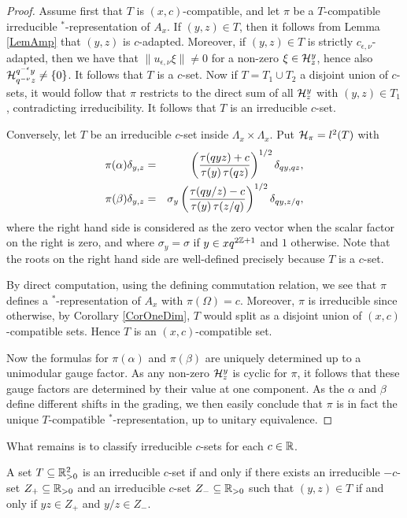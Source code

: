 \begin{proof} Assume first that $T$ is $(x,c)$-compatible, and let $\pi$ be a $T$-compatible irreducible $^*$-representation of $A_x$. If $(y,z)\in T$, then it follows from Lemma \ref{LemAmp} that $(y,z)$ is $c$-adapted. Moreover, if $(y,z)\in T$ is strictly $c_{\epsilon,\nu}$-adapted, then we have that $\|u_{\epsilon,\nu}\xi\|\neq 0$ for a non-zero $\xi\in \mathcal{H}^y_z$, hence also $\mathcal{H}^{q^{-\epsilon}y}_{q^{-\nu}z}\neq \{0\}$. It follows that $T$ is a $c$-set. Now if $T=T_1\cup T_2$ a disjoint union of $c$-sets, it would follow that $\pi$ restricts to the direct sum of all $\mathcal{H}^y_z$ with $(y,z)\in T_1$, contradicting irreducibility. It follows that $T$ is an irreducible $c$-set.

Conversely, let $T$ be an irreducible $c$-set inside $\Lambda_x\times \Lambda_x$. Put $\mathcal{H}_{\pi} = l^2(T)$ with \begin{eqnarray*} \pi(\alpha)  \delta_{y,z} &=&  \left(\frac{\operatorname{\tau}(qyz)+c}{\operatorname{\tau}(y)\operatorname{\tau}(qz)}\right)^{1/2}\delta_{qy,qz},\\ \pi(\beta) \delta_{y,z} &=& \sigma_y\left(\frac{\operatorname{\tau}(qy/z)-c}{\operatorname{\tau}(y)\operatorname{\tau}(z/q)}\right)^{1/2} \delta_{qy,z/q},\end{eqnarray*} where the right hand side is considered as the zero vector when the scalar factor on the right is zero, and where $\sigma_y = \sigma$ if $y\in xq^{2\mathbb{Z}+1}$ and $1$ otherwise. Note that the roots on the right hand side are well-defined precisely because $T$ is a $c$-set. 

By direct computation, using the defining commutation relation, we see that $\pi$ defines a $^*$-representation of $A_x$ with $\pi(\Omega) =c$. Moreover, $\pi$ is irreducible since otherwise, by Corollary \ref{CorOneDim}, $T$ would split as a disjoint union of $(x,c)$-compatible sets. Hence $T$ is an $(x,c)$-compatible set.

Now the formulas for $\pi(\alpha)$ and $\pi(\beta)$ are uniquely determined up to a unimodular gauge factor. As any non-zero $\mathcal{H}^{y}_z$ is cyclic for $\pi$, it follows that these gauge factors are determined by their value at one component. As the $\alpha$ and $\beta$ define different shifts in the grading, we then easily conclude that $\pi$ is in fact the unique $T$-compatible $^*$-representation, up to unitary equivalence.
\end{proof}

What remains is to classify irreducible $c$-sets for each $c\in \mathbb{R}$. 

\begin{Lem}\label{LemClass2D} A set $T\subseteq \mathbb{R}_{>0}^2$ is an irreducible $c$-set if and only if there exists an irreducible $-c$-set $Z_+\subseteq \mathbb{R}_{>0}$ and an irreducible $c$-set $Z_-\subseteq \mathbb{R}_{>0}$ such that $(y,z)\in T$ if and only if $yz\in Z_+$ and $y/z\in Z_-$.
\end{Lem} 

